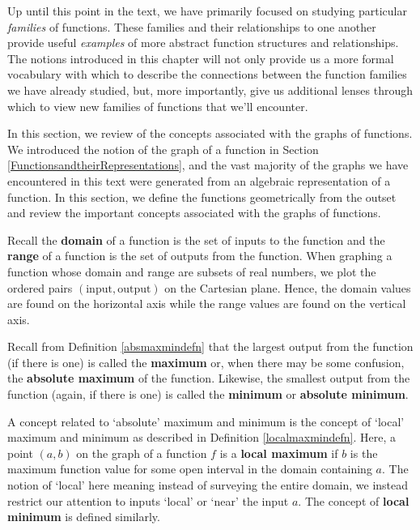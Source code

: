 \documentclass{ximera}
\begin{document}
	\author{Stitz-Zeager}




\setcounter{footnote}{0}

\label{GraphsofFunctions}

Up until this point in the text, we have primarily focused on studying particular \textit{families} of functions.  These families and their relationships to one another provide useful \textit{examples} of more abstract function structures and relationships.  The notions introduced in this chapter will not only provide us a more formal vocabulary with which to describe the connections between the function families we have already studied, but, more importantly,  give us additional lenses through which to  view  new families of functions that we'll encounter.



In this section, we review of the concepts associated with the graphs of functions.  We introduced the notion of the graph of a function  in Section \ref{FunctionsandtheirRepresentations}, and the vast majority of the graphs we have encountered in this text were generated from an algebraic representation of a function.  In this section, we define the functions geometrically from the outset and review the important concepts associated with the graphs of functions.


Recall the \textbf{domain} of a function is the set of inputs to the function and the \textbf{range} of a function is the set of outputs from the function.  When graphing a function whose domain and range are subsets of real numbers, we plot the ordered pairs $(\text{input}, \text{output})$ on the Cartesian plane.  Hence, the domain values are found on the horizontal axis while the range values are found on the vertical axis.


Recall from Definition \ref{absmaxmindefn} that the largest output from the function (if there is one) is called the \textbf{maximum} or, when there may be some confusion, the \textbf{absolute maximum} of the function.  Likewise, the smallest output from the function (again, if there is one) is called the \textbf{minimum} or \textbf{absolute minimum}.  


A concept related to `absolute' maximum and minimum is the concept of `local'  maximum and minimum as described in  Definition \ref{localmaxmindefn}.  Here, a point $(a,b)$ on the graph of a function $f$ is a \textbf{local maximum} if $b$ is the maximum function value for some open interval in the domain containing $a$.  The notion of `local' here meaning instead of surveying the entire domain, we instead restrict our attention to inputs `local' or `near' the input $a$.  The concept of \textbf{local minimum} is defined similarly.
\end{document}

